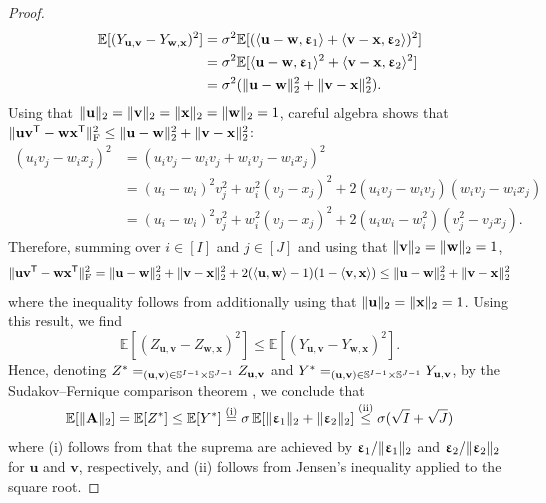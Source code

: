 \documentclass[twoside]{article}
\renewcommand{\ss}[1]{_{\text{#1}}}
\newcommand{\vu}{\mathbf{u}}
\newcommand{\vv}{\mathbf{v}}
\newcommand{\vw}{\mathbf{w}}
\newcommand{\vx}{\mathbf{x}}
\newcommand{\vep}{\bm{\upvarepsilon}}
\newcommand{\mA}{\mathbf{A}}
\newcommand{\E}{\mathbb{E}}
\newcommand{\T}{\text{\textsf{T}}}
\newcommand{\opspace}{}
\let\sup\relax\DeclareMathOperator*{\sup}{sup\opspace}
\renewcommand{\ss}[1]{_{\text{#1}}}        %
\DeclarePairedDelimiter\lra{\langle}{\rangle}    %
\DeclarePairedDelimiter\norm{\|}{\|}             %
\theoremstyle{theoremstyle}
\begin{document}
\begin{proof}
\begin{align}
        \E[(Y_{\vu, \vv} - Y_{\vw, \vx})^2]
        &= \sigma^2 \E[(\lra{\vu - \vw, \vep_1} +  \lra{\vv - \vx, \vep_2})^2] \\
        &= \sigma^2 \E[\lra{\vu - \vw, \vep_1}^2 + \lra{\vv - \vx, \vep_2}^2] \\
        &= \sigma^2 (\norm{\vu - \vw}_2^2 + \norm{\vv - \vx}_2^2).
    \end{align}
    Using that $\norm{\vu}_2 = \norm{\vv}_2 =\norm{\vx}_2 =\norm{\vw}_2 = 1$, careful algebra \citep[see, e.g., page 164 from][]{Wainwright:2019:High-Dimensional_Statistics_A_Non-Asymptotic_Viewpoint} shows that $\norm{\vu \vv^\T - \vw \vx^\T}\ss{F}^2 \le \norm{\vu - \vw}_2^2 + \norm{\vv - \vx}_2^2$:
    \begin{align}
        (u_i v_j - w_i x_j)^2
        &= (u_i v_j - w_i v_j + w_i v_j - w_i x_j)^2 \\
        &= (u_i - w_i)^2 v_j^2 + w_i^2 (v_j - x_j)^2
            + 2 (u_i v_j - w_i v_j) (w_i v_j - w_i x_j) \\
        &= (u_i - w_i)^2 v_j^2 + w_i^2 (v_j - x_j)^2
            + 2 (u_i w_i - w_i^2) (v^2_j - v_j x_j).
    \end{align}
    Therefore, summing over $i \in [I]$ and $j \in [J]$ and using that $\norm{\vv}_2 = \norm{\vw}_2 = 1$,
    \begin{equation}
        \norm{\vu \vv^\T - \vw \vx^\T}^2\ss{F}
        = \norm{\vu - \vw}_2^2 + \norm{\vv - \vx}_2^2 + 2(\lra{\vu, \vw} - 1)(1 - \lra{\vv, \vx})
        \le \norm{\vu - \vw}_2^2 + \norm{\vv - \vx}_2^2
    \end{equation}
    where the inequality follows from additionally using that $\norm{\vu}_2 = \norm{\vx}_2 = 1$.
    Using this result, we find
    \begin{equation}
        \E[(Z_{\vu,\vv} - Z_{\vw, \vx})^2] \le \E[(Y_{\vu, \vv} - Y_{\vw, \vx})^2].
    \end{equation}
    Hence, denoting
    $Z^* = \sup_{(\vu, \vv) \in \mathbb{S}^{I - 1} \times \mathbb{S}^{J - 1}} Z_{\vu,\vv}$
    and $Y^* = \sup_{(\vu, \vv) \in \mathbb{S}^{I - 1} \times \mathbb{S}^{J - 1}} Y_{\vu,\vv}$, by the Sudakov--Fernique comparison theorem \citep[Theorem 5.27,][]{Wainwright:2019:High-Dimensional_Statistics_A_Non-Asymptotic_Viewpoint},
    we conclude that
    \begin{equation}
        \E[\norm{\mA}_2] = \E[Z^*]
        \le \E[Y^*]
        \overset{\smash{\text{(i)}}}{=} \sigma\,\E[\norm{\vep_1}_2 + \norm{\vep_2}_2]
        \overset{\smash{\text{(ii)}}}{\le} \sigma(\sqrt{I} + \sqrt{J})
    \end{equation}
    where (i) follows from that the suprema are achieved by $\vep_1/\norm{\vep_1}_2$ and $\vep_2/\norm{\vep_2}_2$ for $\vu$ and $\vv$, respectively, and  (ii) follows from Jensen's inequality applied to the square root. 
    

\end{proof}
\end{document}
